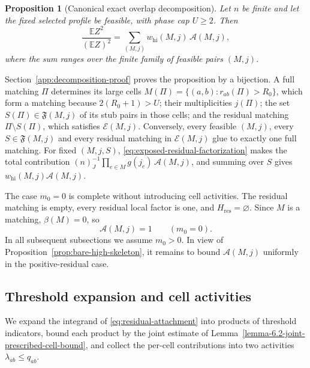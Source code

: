 \documentclass[a4paper,10pt,reqno]{amsart}
\numberwithin{equation}{section}
\theoremstyle{plain}
\newtheorem{proposition}[theorem]{Proposition}
\theoremstyle{remark}
\begin{document}
\begin{proposition}[Canonical exact overlap decomposition]
\label{prop:canonical-exact-overlap-decomposition}
Let $n$ be finite and let the fixed selected profile be feasible, with phase cap
$U\ge2$. Then
\begin{equation}
  \frac{\mathbb E Z^2}{(\mathbb E Z)^2}
  =
  \sum_{(M,j)}w_{\mathrm{hi}}(M,j)\,\mathcal A(M,j),
  \label{eq:exact-attachment-decomposition}
\end{equation}
where the sum ranges over the finite family of feasible pairs $(M,j)$.
\end{proposition}

Section~\ref{app:decomposition-proof} proves the proposition by a bijection.
A full matching $\Pi$ determines its large cells
$M(\Pi)=\{(a,b):r_{ab}(\Pi)>R_0\}$, which form a matching because
$2(R_0+1)>U$; their multiplicities $j(\Pi)$; the set
$S(\Pi)\in\mathfrak F(M,j)$ of its stub pairs in those cells; and the
residual matching $\Pi\setminus S(\Pi)$, which satisfies $\mathcal E(M,j)$.
Conversely, every feasible $(M,j)$, every $S\in\mathfrak F(M,j)$ and every
residual matching in $\mathcal E(M,j)$ glue to exactly one full matching.
For fixed $(M,j,S)$, \eqref{eq:exposed-residual-factorization} makes the
total contribution $(n)_J^{-1}\prod_{e\in M}g(j_e)\,\mathcal A(M,j)$, and
summing over $S$ gives $w_{\mathrm{hi}}(M,j)\mathcal A(M,j)$.

The case $m_0=0$ is complete without introducing cell activities. The residual
matching is empty, every residual local factor is one, and
$H_{\mathrm{res}}=\varnothing$. Since $M$ is a matching,
$\beta(M)=0$, so
\begin{equation}
  \mathcal A(M,j)=1
  \qquad(m_0=0).
  \label{eq:zero-residual-attachment}
\end{equation}
In all subsequent subsections we assume $m_0>0$. In view of
Proposition~\ref{prop:bare-high-skeleton}, it remains to bound
$\mathcal A(M,j)$ uniformly in the positive-residual case.

\subsection{Threshold expansion and cell activities}

We expand the integrand of \eqref{eq:residual-attachment} into products of
threshold indicators, bound each product by the joint estimate of
Lemma~\ref{lemma-6.2-joint-prescribed-cell-bound}, and collect the per-cell
contributions into two activities $\lambda_{ab}\le q_{ab}$.
\end{document}
